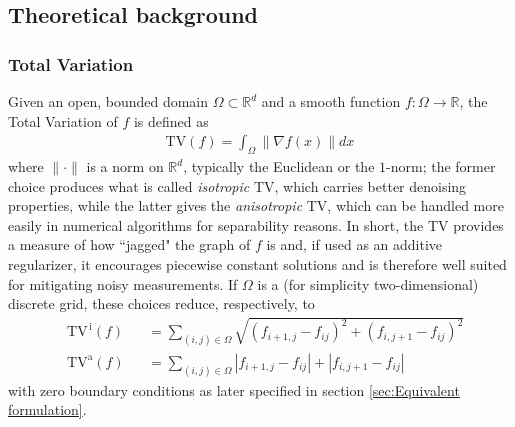 \documentclass[journal,twoside,web]{ieeecolor}
\newcommand{\R}{\mathbb{R}}
\begin{document}
\subsection{Theoretical background}
\subsubsection{Total Variation} Given an open, bounded domain $\Omega \subset \R^d$ and a smooth function $f:\Omega \to \R$, the Total Variation of $f$ is defined as
\begin{align}
    \mathrm{TV}(f) = \int_\Omega \| \nabla f(x) \| dx
\end{align}
where $\| \cdot \|$ is a norm on $\R^d$, typically the Euclidean or the $1$-norm; the former choice produces what is called \textit{isotropic} TV, which carries better denoising properties, while the latter gives the \textit{anisotropic} TV, which can be handled more easily in numerical algorithms for separability reasons. In short, the TV provides a measure of how ``jagged" the graph of $f$ is and, if used as an additive regularizer, it encourages piecewise constant solutions and is therefore well suited for mitigating noisy measurements. If $\Omega$ is a (for simplicity two-dimensional) discrete grid, these choices reduce, respectively, to
\begin{subequations}\label{eq:TV standard discrete}
\begin{alignat}{3}
  & \mathrm{TV^{\,i}}(f) \label{eq:TV standard iso} & & = \sum_{(i,j)\in\Omega}\sqrt{(f_{i+1,j}-f_{ij})^2 + (f_{i,j+1}-f_{ij})^2 } \\
  & \mathrm{TV^a}(f) \label{eq:TV standard aniso} & & = \sum_{(i,j)\in\Omega} | f_{i+1,j}-f_{ij} | + | f_{i,j+1}-f_{ij} |
\end{alignat}
\end{subequations}
with zero boundary conditions as later specified in section \ref{sec:Equivalent formulation}.
\end{document}
